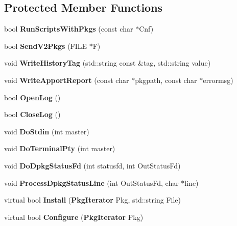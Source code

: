 \subsection*{\-Protected \-Member \-Functions}
\begin{DoxyCompactItemize}
\item 
bool {\bfseries \-Run\-Scripts\-With\-Pkgs} (const char $\ast$\-Cnf)\label{classpkgDPkgPM_af5f09e66635bc2b4224eb1ef28fb6941}

\item 
bool {\bfseries \-Send\-V2\-Pkgs} (\-F\-I\-L\-E $\ast$\-F)\label{classpkgDPkgPM_aaa42ce922816957c1c2ddf42b74cfc41}

\item 
void {\bfseries \-Write\-History\-Tag} (std\-::string const \&tag, std\-::string value)\label{classpkgDPkgPM_a966afa9f2b64d0312b08b5691434801e}

\item 
void {\bfseries \-Write\-Apport\-Report} (const char $\ast$pkgpath, const char $\ast$errormsg)\label{classpkgDPkgPM_aac638e474068d15daf05e53ee784b0c6}

\item 
bool {\bfseries \-Open\-Log} ()\label{classpkgDPkgPM_a367828235aced7bf124b0cd6827d9a2d}

\item 
bool {\bfseries \-Close\-Log} ()\label{classpkgDPkgPM_aa19957b6584dcb60312e625fc5c9dc88}

\item 
void {\bfseries \-Do\-Stdin} (int master)\label{classpkgDPkgPM_afda8f279f3446d6b9ca0788643a12aae}

\item 
void {\bfseries \-Do\-Terminal\-Pty} (int master)\label{classpkgDPkgPM_a1290ff9fc293b3678930c1e52015a4ae}

\item 
void {\bfseries \-Do\-Dpkg\-Status\-Fd} (int statusfd, int \-Out\-Status\-Fd)\label{classpkgDPkgPM_a94882957a3cc63d55b7d999c3606244c}

\item 
void {\bfseries \-Process\-Dpkg\-Status\-Line} (int \-Out\-Status\-Fd, char $\ast$line)\label{classpkgDPkgPM_a48cf719e90d112bdc2a2f450dab3f745}

\item 
virtual bool {\bfseries \-Install} ({\bf \-Pkg\-Iterator} \-Pkg, std\-::string \-File)\label{classpkgDPkgPM_a7ee4c25b06686737612d9e9b032f3809}

\item 
virtual bool {\bfseries \-Configure} ({\bf \-Pkg\-Iterator} \-Pkg)\label{classpkgDPkgPM_a690a971db6740b8b46028b681bff0224}


\end{DoxyCompactItemize}
